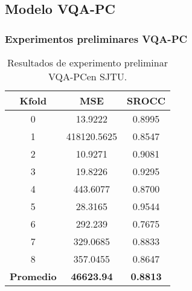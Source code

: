 \subsection{Modelo VQA-PC}

\begin{frame}
  \frametitle{Experimentos preliminares VQA-PC}
\begin{table}[htp]
  \small
  \begin{center}
    \begin{tabular}[c]{|c|c|c|}
      \hline
      \rowcolor[HTML]{FFC702}
      \textbf{Kfold} & \textbf{MSE} & \textbf{SROCC} \\ 
      \hline 
      0 & 13.9222 & 0.8995 \\
      \hline 
      1 & 418120.5625 & 0.8547 \\ 
      \hline 
      2 & 10.9271 & 0.9081 \\
      \hline 
      3 & 19.8226 & 0.9295 \\ 
      \hline 
      4 & 443.6077 & 0.8700 \\ 
      \hline 
      5 & 28.3165 & 0.9544 \\ 
      \hline 
      6 & 292.239 & 0.7675 \\ 
      \hline 
      7 & 329.0685 & 0.8833 \\ 
      \hline 
      8 & 357.0455 & 0.8647 \\ 
      \hline
      \textbf{\cellcolor[HTML]{FFC702}Promedio} & \textbf{46623.94} & \textbf{0.8813} \\ 
      \hline
    \end{tabular}
  \end{center}
  \caption[Resultados de experimento preliminar VQA-PC en SJTU.]{
    Resultados de experimento preliminar VQA-PC\footnotemark[13] en SJTU\footnotemark[7]. 
  }
  \label{tab:PreTestResults}
\end{table}
\end{frame}


